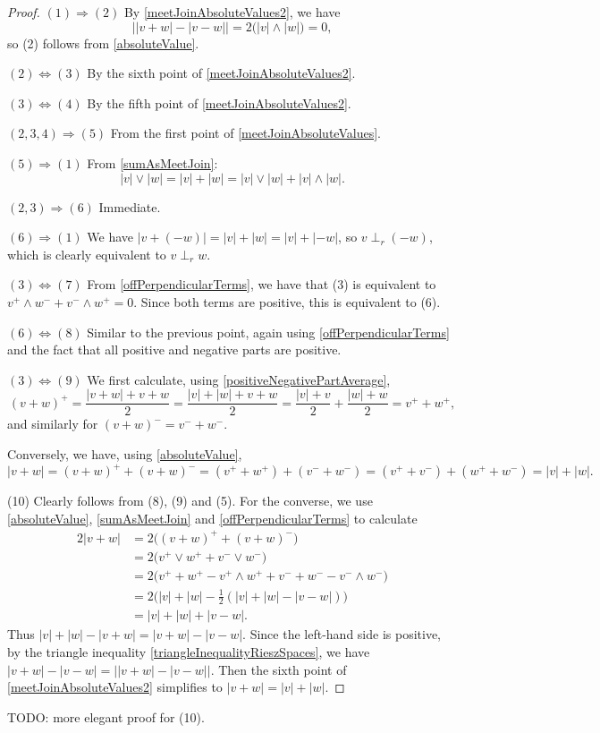 \begin{proof}
$(1) \Rightarrow (2)$ By \ref{meetJoinAbsoluteValues2}, we have
\[ \big||v+w| - |v-w|\big| = 2\big(|v|\wedge |w|\big) = 0, \]
so (2) follows from \ref{absoluteValue}.

$(2) \Leftrightarrow (3)$ By the sixth point of \ref{meetJoinAbsoluteValues2}.

$(3) \Leftrightarrow (4)$ By the fifth point of \ref{meetJoinAbsoluteValues2}.

$(2,3,4) \Rightarrow (5)$ From the first point of \ref{meetJoinAbsoluteValues}.

$(5) \Rightarrow (1)$ From \ref{sumAsMeetJoin}:
\[ |v|\vee |w| = |v|+ |w| = |v|\vee |w| + |v|\wedge |w|. \]

$(2,3) \Rightarrow (6)$ Immediate.

$(6) \Rightarrow (1)$ We have $|v+(-w)| = |v|+|w| = |v|+|-w|$, so $v\perp_r (-w)$, which is clearly equivalent to $v\perp_r w$.

$(3) \Leftrightarrow (7)$ From \ref{offPerpendicularTerms}, we have that (3) is equivalent to $v^+\wedge w^- + v^- \wedge w^+ = 0$. Since both terms are positive, this is equivalent to (6).

$(6) \Leftrightarrow (8)$ Similar to the previous point, again using \ref{offPerpendicularTerms} and the fact that all positive and negative parts are positive.

$(3) \Leftrightarrow (9)$ We first calculate, using \ref{positiveNegativePartAverage},
\[ (v+w)^+ = \frac{|v+w|+v+w}{2} = \frac{|v|+|w|+v+w}{2} = \frac{|v|+v}{2} + \frac{|w|+w}{2} = v^+ + w^+, \]
and similarly for $(v+w)^- = v^- + w^-$.

Conversely, we have, using \ref{absoluteValue},
\[ |v+w| = (v+w)^+ + (v+w)^- = (v^+ + w^+) + (v^- + w^-) = (v^+ + v^-) + (w^+ + w^-) = |v| + |w|. \]

(10) Clearly follows from (8), (9) and (5). For the converse, we use \ref{absoluteValue}, \ref{sumAsMeetJoin} and \ref{offPerpendicularTerms} to calculate
\begin{align*}
2|v+w| &= 2\big((v+w)^+ + (v+w)^-\big) \\
&= 2\big(v^+\vee w^+ + v^-\vee w^-\big) \\
&= 2\big(v^+ + w^+ - v^+\wedge w^+ + v^- + w^-  - v^-\wedge w^-\big) \\
&= 2\big(|v| + |w| - \frac{1}{2}(|v|+ |w| - |v-w|)\big) \\
&= |v|+|w| + |v-w|.
\end{align*}
Thus $|v|+ |w| - |v+w| = |v+w| - |v-w|$. Since the left-hand side is positive, by the triangle inequality \ref{triangleInequalityRieszSpaces}, we have $|v+w| - |v-w| = \big||v+w| - |v-w|\big|$. Then the sixth point of \ref{meetJoinAbsoluteValues2} simplifies to $|v+w| = |v| + |w|$.
\end{proof}
TODO: more elegant proof for (10).


